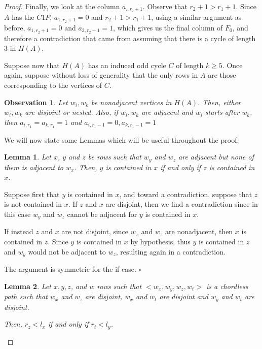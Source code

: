\documentclass[a4paper,10pt]{report}
\theoremstyle{plain}
\newtheorem{lema}{Lemma}
\theoremstyle{remark}
\theoremstyle{plain}
\newtheorem{obs}{Observation}
\newcommand*{\QED}{\hfill\ensuremath{\square}}%
\begin{document}
\begin{proof}
	Finally, we look at the column $a_{., r_2 +1}$. Observe that $r_2 +1 > r_1 + 1$. 
	Since $A$ has the $C1P$, $a_{1, r_2 +1} = 0$ and $r_2 +1 > r_1+1$, 
	using a similar argument as before, $a_{1,r_2+1} =0$ and $a_{3,r_2+1} = 1$, which gives us the final column of $F_0$, and therefore
	a contradiction that came from assuming that there is a cycle of length 3 in $H(A)$.
	
	\vspace{1mm}
	Suppose now that $H(A)$ has an induced odd cycle $C$ of length $k \geq 5$. Once again, suppose without loss of generality that
	the only rows in $A$ are those corresponding to the vertices of $C$.
	
	\begin{obs}
		Let $w_i, w_k$ be nonadjacent vertices in $H(A)$. Then, either $w_i, w_k$ are disjoint
		or nested.
		Also, if $w_i, w_k$ are adjacent and $w_i$ starts after $w_k$, 
		then $a_{i,r_1} = a_{k,r_1} = 1$ and $a_{i,r_1-1} = 0, a_{k,r_1 -1} = 1$
	\end{obs}
	
	We will now state some Lemmas which will be useful throughout the proof.
	
	\begin{lema} \label{2N_l1}
	 Let $x$, $y$ and $z$ be rows such that $w_y$ and $w_z$ are adjacent but none of them is adjacent to $w_x$. Then, $y$ is contained in $x$ if and only if $z$ is contained in $x$.
	\end{lema}
	
	Suppose first that $y$ is contained in $x$, and toward a contradiction, suppose that $z$ is not contained in $x$.
	If $z$ and $x$ are disjoint, then we find a contradiction since in this case $w_y$ and $w_z$ cannot be adjacent for $y$ is contained in $x$.
	
	If instead $z$ and $x$ are not disjoint, since $w_x$ and $w_z$ are nonadjacent,
	then $x$ is contained in $z$. Since $y$ is contained in $x$ by hypothesis, thus $y$ is contained in $z$ and $w_y$ would not be adjacent to $w_z$, resulting again in a contradiction. 
	
	The argument is symmetric for the if case. \QED
	
	\begin{lema} \label{2N_l2}
		Let $x, y, z$, and $w$ rows such that $< w_x, w_y, w_z, w_t >$ is a chordless
		path such that $w_x$ and $w_z$ are disjoint, $w_x$ and $w_t$ are disjoint 
		and $w_y$ and $w_t$ are disjoint. 
		
		Then, $r_z < l_x$ if and only if $r_t < l_y$.		
	\end{lema}
	

\end{proof}
\end{document}
